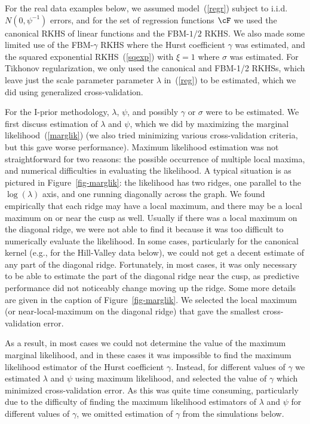 \documentclass[preprint,12pt,authoryear]{elsarticle}
\begin{document}
For the real data examples below, we assumed model~(\ref{regr}) subject to i.i.d.\  $N(0,\psi^{-1})$ errors, and for the set of regression functions $\cF$ we used the canonical RKHS of linear functions and the FBM-$1/2$ RKHS. We also made some limited use of the FBM-$\gamma$ RKHS where the Hurst coefficient $\gamma$ was estimated, and the squared exponential RKHS~(\ref{sqexp}) with $\xi=1$ where $\sigma$ was estimated. 
For Tikhonov regularization, we only used the canonical and FBM-1/2 RKHSs, which leave just the scale parameter parameter $\lambda$ in~(\ref{reg}) to be estimated, which we did using generalized cross-validation. 


For the I-prior methodology, $\lambda$, $\psi$, and possibly $\gamma$ or $\sigma$ were to be estimated. 
We first discuss estimation of $\lambda$ and $\psi$, which we did by maximizing the marginal likelihood~(\ref{marglik}) (we also tried minimizing various cross-validation criteria, but this gave worse performance). Maximum likelihood estimation was not straightforward for two reasons: the possible occurrence of multiple local maxima, and numerical difficulties in evaluating the likelihood. 
A typical situation is as pictured in Figure~\ref{fig-marglik}: the likelihood has two ridges, one parallel to the $\log(\lambda)$ axis, and one running diagonally across the graph. We found empirically that each ridge may have a local maximum, and there may be a local maximum on or near the cusp as well. Usually if there was a local maximum on the diagonal ridge, we were not able to find it because it was too difficult to numerically evaluate the likelihood. In some cases, particularly for the canonical kernel (e.g., for the Hill-Valley data below), we could not get a decent estimate of any part of the diagonal ridge. Fortunately, in most cases, it was only necessary to be able to estimate the part of the diagonal ridge near the cusp, as predictive performance did not noticeably change moving up the ridge. 
Some more details are given in the caption of Figure~\ref{fig-marglik}.
We selected the local maximum (or near-local-maximum on the diagonal ridge) that gave the smallest cross-validation error. 

As a result, in most cases we could not determine the value of the maximum marginal likelihood, and in these cases it was impossible to find the maximum likelihood estimator of the Hurst coefficient $\gamma$. Instead, for different values of $\gamma$ we estimated $\lambda$ and $\psi$ using maximum likelihood, and selected the value of  $\gamma$ which minimized cross-validation error. As this was quite time consuming, particularly due to the difficulty of finding the maximum likelihood estimators of $\lambda$ and $\psi$ for different values of $\gamma$, we omitted estimation of $\gamma$ from the simulations below. 
\end{document}
